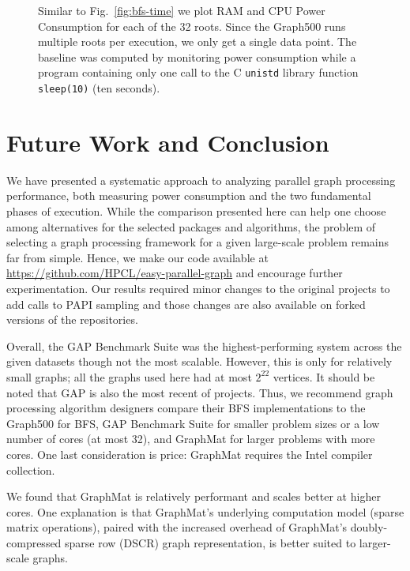 \documentclass{llncs}
\begin{document}
\begin{figure}
\begin{minipage}{0.48\linewidth}
	\end{minipage}
	\caption{Similar to Fig.~\ref{fig:bfs-time} we plot RAM and CPU Power Consumption for each of the 32 roots. Since the Graph500 runs multiple roots per execution, we only get a single data point. The baseline was computed by monitoring power consumption while a program containing only one call to the C \texttt{unistd} library function \texttt{sleep(10)} (ten seconds).}
	\label{fig:power}
\end{figure}

\section{Future Work and Conclusion}
We have presented a systematic approach to analyzing parallel graph processing performance, both measuring power consumption and the two fundamental phases of execution. While the comparison presented here can help one choose among alternatives for the selected packages and algorithms, the problem of selecting a graph processing framework for a given large-scale problem remains far from simple. Hence, we make our code available at \url{https://github.com/HPCL/easy-parallel-graph} and encourage further experimentation. Our results required minor changes to the original projects to add calls to PAPI sampling and those changes are also available on forked versions of the repositories. 

Overall, the GAP Benchmark Suite was the highest-performing system across the given datasets though not the most scalable. However, this is only for relatively small graphs; all the graphs used here had at most $2^{22}$ vertices. It should be noted that GAP is also the most recent of projects. Thus, we recommend graph processing algorithm designers compare their BFS implementations to the Graph500 for BFS, GAP Benchmark Suite for smaller problem sizes or a low number of cores (at most 32), and GraphMat for larger problems with more cores. One last consideration is price: GraphMat requires the Intel compiler collection.

We found that GraphMat is relatively performant and scales better at higher cores. One explanation is that GraphMat's underlying computation model (sparse matrix operations), paired with the increased overhead of GraphMat's doubly-compressed sparse row (DSCR) graph representation, is better suited to larger-scale graphs.
\end{document}
